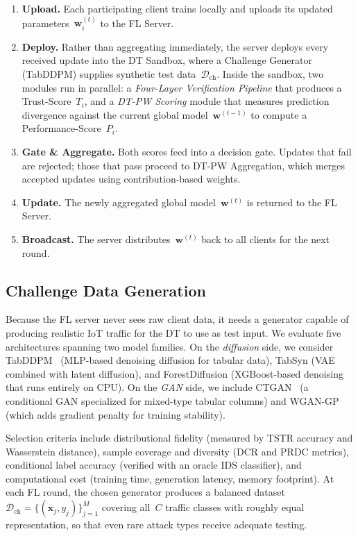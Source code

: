 \documentclass[conference]{IEEEtran}
\newcommand{\cmark}[1]{\raisebox{.5pt}{\textcircled{\raisebox{-.9pt}{\scriptsize\bfseries #1}}}}
\begin{document}
    \begin{enumerate}
        \item[\cmark{1}] \textbf{Upload.} Each participating client trains locally and uploads its updated parameters~$\mathbf{w}_i^{(t)}$ to the FL Server.
        \item[\cmark{2}] \textbf{Deploy.} Rather than aggregating immediately, the server deploys every received update into the DT Sandbox, where a Challenge Generator (TabDDPM) supplies synthetic test data~$\mathcal{D}_{\text{ch}}$. Inside the sandbox, two modules run in parallel: a \emph{Four-Layer Verification Pipeline} that produces a Trust-Score~$T_i$, and a \emph{DT-PW Scoring} module that measures prediction divergence against the current global model~$\mathbf{w}^{(t-1)}$ to compute a Performance-Score~$P_i$.
        \item[\cmark{3}] \textbf{Gate \& Aggregate.} Both scores feed into a decision gate. Updates that fail are rejected; those that pass proceed to DT-PW Aggregation, which merges accepted updates using contribution-based weights.
        \item[\cmark{4}] \textbf{Update.} The newly aggregated global model~$\mathbf{w}^{(t)}$ is returned to the FL Server.
        \item[\cmark{5}] \textbf{Broadcast.} The server distributes~$\mathbf{w}^{(t)}$ back to all clients for the next round.
    \end{enumerate}
    
    
    
    
    \subsection{Challenge Data Generation}
    
    Because the FL server never sees raw client data, it needs a generator capable of producing realistic IoT traffic for the DT to use as test input. We evaluate five architectures spanning two model families. On the \emph{diffusion} side, we consider TabDDPM~\cite{kotelnikov2023tabddpm} (MLP-based denoising diffusion for tabular data), TabSyn (VAE combined with latent diffusion), and ForestDiffusion (XGBoost-based denoising that runs entirely on CPU). On the \emph{GAN} side, we include CTGAN~\cite{xu2019modeling} (a conditional GAN specialized for mixed-type tabular columns) and WGAN-GP (which adds gradient penalty for training stability).
    
    Selection criteria include distributional fidelity (measured by TSTR accuracy and Wasserstein distance), sample coverage and diversity (DCR and PRDC metrics), conditional label accuracy (verified with an oracle IDS classifier), and computational cost (training time, generation latency, memory footprint). At each FL round, the chosen generator produces a balanced dataset $\mathcal{D}_{\text{ch}} = \{(\mathbf{x}_j, y_j)\}_{j=1}^{M}$ covering all~$C$ traffic classes with roughly equal representation, so that even rare attack types receive adequate testing.
    
\end{document}
